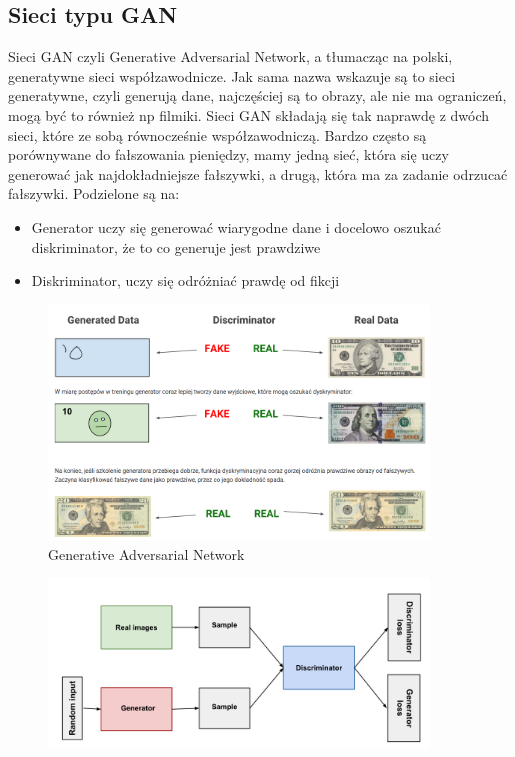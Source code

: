 \documentclass[12pt]{article}
\begin{document}
\begin{sloppypar}
{  \subsection{Sieci typu GAN}
  {
    Sieci GAN czyli Generative Adversarial Network, a tłumacząc na polski, generatywne sieci współzawodnicze.
    Jak sama nazwa wskazuje są to sieci generatywne, czyli generują dane, najczęściej są to obrazy, ale nie ma ograniczeń, mogą być to również np filmiki.
    Sieci GAN składają się tak naprawdę z dwóch sieci, które ze sobą równocześnie współzawodniczą.
    Bardzo często są porównywane do fałszowania pieniędzy, mamy jedną sieć, która się uczy generować jak najdokładniejsze fałszywki, a drugą, która ma za zadanie odrzucać fałszywki.
    Podzielone są na:
    \begin{itemize}
      \item Generator uczy się generować wiarygodne dane i docelowo oszukać diskriminator, że to co generuje jest prawdziwe
      \item Diskriminator, uczy się odróżniać prawdę od fikcji
    \end{itemize}
    \begin{figure}[H]
      \centering
      \includegraphics[width=0.9\textwidth]{gan.png}
      \caption{Generative Adversarial Network \cite{google-gan}}
      \label{fig:gan}
    \end{figure}
    \begin{figure}[H]
      \centering
      \includegraphics[width=0.9\textwidth]{gan-budowa.png}

\end{figure}}}
\end{sloppypar}
\end{document}
